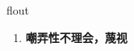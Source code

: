 
\begin{frame}
{\huge flout}
\begin{center}
\begin{enumerate}\Large
  \item \textbf{嘲弄性不理会，蔑视}
\end{enumerate}
\end{center}
\end{frame}

